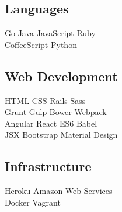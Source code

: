 \documentclass[]{deedy-resume-openfont}
\begin{document}
\begin{minipage}[t]{0.33\textwidth}
\subsection{Languages}
Go \textbullet{} Java \textbullet{} JavaScript \textbullet{} Ruby \\
CoffeeScript \textbullet{} Python
\sectionsep
\subsection{Web Development}
HTML \textbullet{} CSS \textbullet{} Rails \textbullet{} Sass \\
Grunt \textbullet{} Gulp \textbullet{} Bower \textbullet{} Webpack \\
Angular \textbullet{} React \textbullet{} ES6 \textbullet{} Babel \\
JSX \textbullet{} Bootstrap \textbullet{} Material Design \\
\sectionsep
\subsection{Infrastructure}
Heroku \textbullet{} Amazon Web Services \\
Docker \textbullet{} Vagrant \\

%
%

\end{minipage}
\hfill
\end{document}
